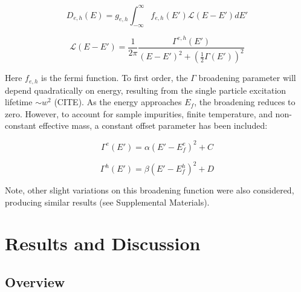 \documentclass[aps,prl,preprint,superscriptaddress]{revtex4-2}
\begin{document}
\begin{equation} \label{Lorentzian Convolution}
D_{e,h}(E) = g_{e,h} \int_{-\infty}^\infty f_{e,h}(E') \mathcal{L}(E - E') dE'
\end{equation}

\begin{equation} \label{Lorentzian Term}
\mathcal{L}(E - E') = \frac{1}{2\pi} \frac{\Gamma^{e,h}(E')}{(E - E')^2 + (\frac{1}{2} \Gamma(E'))^2}
\end{equation}

Here $f_{e,h}$ is the fermi function. To first order, the $\Gamma$ broadening parameter will depend quadratically on energy, resulting from the single particle excitation lifetime $\sim w^2$ (CITE). As the energy approaches $E_f$, the broadening reduces to zero. However, to account for sample impurities, finite temperature, and non-constant effective mass, a constant offset parameter has been included:

\begin{equation} \label{Gamma factor}
\Gamma^{e}(E') = \alpha(E' - E_f^{e})^2 + C
\end{equation}

\begin{equation} \label{Gamma factor}
\Gamma^{h}(E') = \beta(E' - E_f^{h})^2 + D
\end{equation}

Note, other slight variations on this broadening function were also considered, producing similar results (see Supplemental Materials).

\section{Results and Discussion}

\subsection{Overview}
\end{document}
